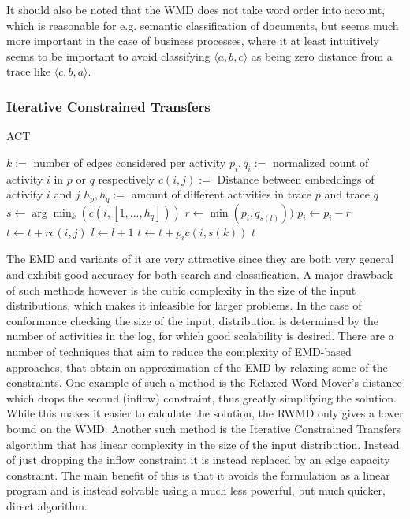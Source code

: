 \documentclass[runningheads]{template/llncs}
\begin{document}
It should also be noted that the WMD does not take word order into account, which is reasonable for e.g. semantic classification of documents, but seems much more important in the case of business processes, where it at least intuitively seems to be important to avoid classifying $\langle a,b,c\rangle$ as being zero distance from a trace like $\langle c,b,a \rangle$.

\subsubsection{Iterative Constrained Transfers}
\begin{algorithm}
	\caption{ACT}\label{alg:act}
	\begin{algorithmic}
		\State $k:=$ number of edges considered per activity
		\State $p_i,q_i := $ normalized count of activity $i$ in $p$ or $q$ respectively
		\State $c(i,j) :=$ Distance between embeddings of activity $i$ and $j$
		\State $h_p,h_q :=$ amount of different activities in trace $p$ and trace $q$ 
		\State $s \gets \arg \min_k(c(i,[1,...,h_q]))$ 
		\State $r \gets \min(p_i,q_{s(l)}))$ 
		\State $p_i \gets p_i - r$ 
		\State $t \gets t + rc(i,j)$ 
		\State $l \gets l+1$
		\EndWhile
		 
		\State $t \gets t + p_ic(i,s(k))$ 
		\EndIf
		\EndFor
		\State \Return $t$
		\EndFunction
	\end{algorithmic}
\end{algorithm}
The EMD and variants of it are very attractive since they are both very general and exhibit good accuracy for both search and classification.
A major drawback of such methods however is the cubic complexity in the size of the input distributions, which makes it infeasible for larger problems.
In the case of conformance checking the size of the input, distribution is determined by the number of activities in the log, for which good scalability is desired.
There are a number of techniques that aim to reduce the complexity of EMD-based approaches, that obtain an approximation of the EMD by relaxing some of the constraints.  
One example of such a method is the Relaxed Word Mover's distance which drops the second (inflow) constraint, thus greatly simplifying the solution.
While this makes it easier to calculate the solution, the RWMD only gives a lower bound on the WMD.
Another such method is the Iterative Constrained Transfers \cite{AtMi18} algorithm that has linear complexity in the size of the input distribution.
Instead of just dropping the inflow constraint it is instead replaced by an edge capacity constraint.
The main benefit of this is that it avoids the formulation as a linear program and is instead solvable using a much less powerful, but much quicker, direct algorithm.
\end{document}
